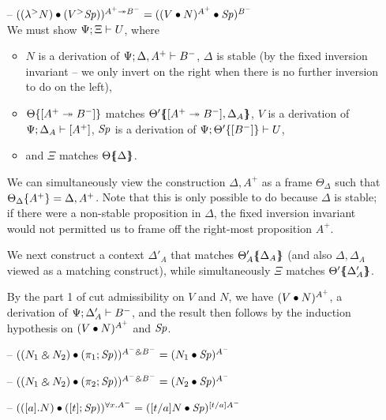 \begin{itemize}
\item[--] $({({\lambda}^{>}{N})} \bullet {({V}{^{>}}{{\it Sp}})})^{A^+ \twoheadrightarrow B^-} 
           = ({({V} \bullet {N})^{A^+}} \bullet {{\it Sp}})^{B^-}$\smallskip\\
  We must show ${\Psi};{\Xi} \vdash {U}$, where
  \begin{itemize}
  \item $N$ is a derivation of 
     ${\Psi};{\Delta, A^+} \vdash {B^-}$, $\Delta$ is stable (by the fixed
     inversion invariant -- we only invert on the right when there is 
     no further inversion to do on the left), 
  \item ${\Theta}\{{[A^+ \twoheadrightarrow B^-]}\}$ matches 
     ${\Theta'}\mbox{$\{\hspace{-4pt}\{$}{[A^+ \twoheadrightarrow B^-], \Delta_A}\mbox{$\}\hspace{-4pt}\}$}$, 
     $V$ is a derivation of ${\Psi};{\Delta_A} \vdash {[A^+]}$,
     ${\it Sp}$ is a derivation of ${\Psi};{{\Theta'}\{{[B^-]}\}} \vdash {U}$,
  \item and $\Xi$ matches ${\Theta}\mbox{$\{\hspace{-4pt}\{$}{\Delta}\mbox{$\}\hspace{-4pt}\}$}$.
  \end{itemize}
  We can simultaneously view the construction $\Delta,A^+$ as a frame
  $\Theta_\Delta$ such that ${\Theta_\Delta}\{{A^+}\} =
  \Delta,A^+$.  Note that this is only possible to do because $\Delta$
  is stable; if there were a non-stable proposition in $\Delta$, the
  fixed inversion invariant would not permitted us to frame off the
  right-most proposition $A^+$.

  We next construct a context $\Delta'_A$ that matches
  ${\Theta'_A}\mbox{$\{\hspace{-4pt}\{$}{\Delta_A}\mbox{$\}\hspace{-4pt}\}$}$ (and also $\Delta, \Delta_A$ viewed
  as a matching construct), while simultaneously
  $\Xi$ matches ${\Theta'}\mbox{$\{\hspace{-4pt}\{$}{\Delta'_A}\mbox{$\}\hspace{-4pt}\}$}$. 

  By the part 1 of cut admissibility
  on $V$ and $N$, we have $({V} \bullet {N})^{A^+}$, a derivation of 
  ${\Psi};{\Delta'_A} \vdash {B^-}$, and 
  the result then follows by the induction hypothesis on 
  $({V} \bullet {N})^{A^+}$ and ${\it Sp}$.  \smallskip

\item[--] $({({N_1} \mathbin{\binampersand} {N_2})} \bullet {(\pi_1;{{\it Sp}})})^{A^- \mathbin{\binampersand} B^-}
           = ({N_1} \bullet {{\it Sp}})^{A^-}$

\item[--] $({({N_1} \mathbin{\binampersand} {N_2})} \bullet {(\pi_2;{{\it Sp}})})^{A^- \mathbin{\binampersand} B^-}
           = ({N_2} \bullet {{\it Sp}})^{A^-}$

\item[--] $({([{a}].{N})} \bullet {([{t}]; {{\it Sp}})})^{\forall x.A^-}
           = ({[t/a]N} \bullet {{\it Sp}})^{[t/a]A^-}$
\end{itemize}

